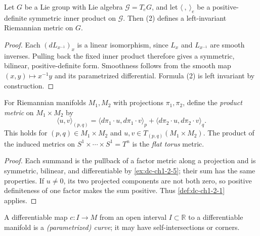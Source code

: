 \begin{proposition}
  \label{prop:dc-ch1-2-6-leftinv}


  Let $G$ be a Lie group with Lie algebra $\mathcal{G}=T_eG$, and let
  $\langle\ ,\ \rangle_e$ be a positive-definite symmetric inner product on
  $\mathcal{G}$. Then (2) defines a left-invariant Riemannian metric on $G$.
\end{proposition}
\begin{proof}

  \sketch
  Each $(dL_{x^{-1}})_x$ is a linear isomorphism, since $L_x$ and $L_{x^{-1}}$
  are smooth inverses. Pulling back the fixed inner product therefore gives a
  symmetric, bilinear, positive-definite form. Smoothness follows from the smooth
  map $(x,y)\mapsto x^{-1}y$ and its parametrized differential. Formula (2) is
  left invariant by construction.
\end{proof}

\begin{example}
  \label{ex:dc-ch1-2-7}


  For Riemannian manifolds $M_1,M_2$ with projections $\pi_1,\pi_2$, define
  the \emph{product metric} on $M_1\times M_2$ by
  $$
  \langle u,v\rangle_{(p,q)}=
  \langle d\pi_1\cdot u,d\pi_1\cdot v\rangle_p+
  \langle d\pi_2\cdot u,d\pi_2\cdot v\rangle_q.
  $$
  This holds for $(p,q)\in M_1\times M_2$ and
  $u,v\in T_{(p,q)}(M_1\times M_2)$.
  The product of the induced metrics on $S^1\times\cdots\times S^1=T^n$ is the
  \emph{flat torus} metric.
\end{example}
\begin{proof}

  \sketch
  Each summand is the pullback of a factor metric along a projection and is
  symmetric, bilinear, and differentiable by \cref{ex:dc-ch1-2-5}; their sum has
  the same properties. If $u\ne0$, its two projected components are not both zero,
  so positive definiteness of one factor makes the sum positive. Thus
  \cref{def:dc-ch1-2-1} applies.
\end{proof}

\begin{definition}
  \label{def:dc-ch1-2-8}

  A differentiable map $c:I\to M$ from an open interval $I\subset\mathbb{R}$ to
  a differentiable manifold is a \emph{(parametrized) curve}; it may have
  self-intersections or corners.
\end{definition}

